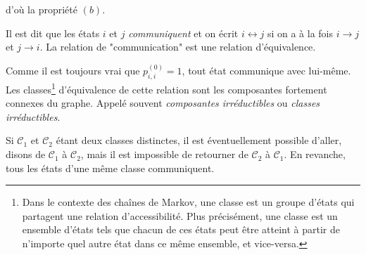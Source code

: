 \begin{sloppypar}
d'où la propriété $(b)$.

\begin{tcolorbox}[colback=blue!5!white,colframe=blue!75!black,title=Définition]
Il est dit que les états $i$ et $j$ \emph{communiquent} et on écrit $i \leftrightarrow j$ si on a à la fois $i \rightarrow j$ et $j \rightarrow i$. La relation de "communication" est une relation d’équivalence.
\end{tcolorbox}

Comme il est toujours vrai que $p^{(0)}_{i,i} = 1$, tout état communique avec lui-même.\\

Les classes\footnote{Dans le contexte des chaînes de Markov, une classe est un groupe d’états qui partagent une relation d’accessibilité. Plus précisément, une classe est un ensemble d'états tels que chacun de ces états peut être atteint à partir de n'importe quel autre état dans ce même ensemble, et vice-versa.} d'équivalence de cette relation sont les composantes fortement connexes du graphe. 
Appelé souvent \emph{composantes irréductibles} ou \emph{classes irréductibles}.\\

\begin{center}
\end{center}


Si $\mathcal{C}_1$ et $\mathcal{C}_2$ étant deux classes distinctes, il est éventuellement possible d’aller, disons de $\mathcal{C}_1$ à $\mathcal{C}_2$, mais il est impossible de
retourner de $\mathcal{C}_2$ à $\mathcal{C}_1$. En revanche, tous les états d’une même classe communiquent.\\


\end{sloppypar}
